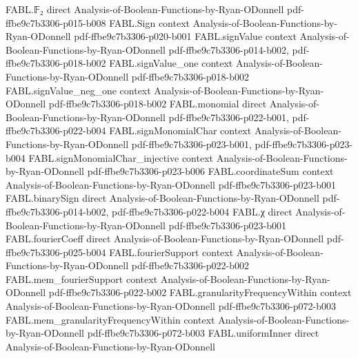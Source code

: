 \begin{theorem}
\label{FABL.composedMajority_monotone}
\leanok
{}
\proofstep
  {FABL.𝔽₂}
  {direct}
  {Analysis-of-Boolean-Functions-by-Ryan-ODonnell}
  {pdf-ffbe9c7b3306-p015-b008}
\proofstep
  {FABL.Sign}
  {context}
  {Analysis-of-Boolean-Functions-by-Ryan-ODonnell}
  {pdf-ffbe9c7b3306-p020-b001}
\proofstep
  {FABL.signValue}
  {context}
  {Analysis-of-Boolean-Functions-by-Ryan-ODonnell}
  {pdf-ffbe9c7b3306-p014-b002,
    pdf-ffbe9c7b3306-p018-b002}
\proofstep
  {FABL.signValue_one}
  {context}
  {Analysis-of-Boolean-Functions-by-Ryan-ODonnell}
  {pdf-ffbe9c7b3306-p018-b002}
\proofstep
  {FABL.signValue_neg_one}
  {context}
  {Analysis-of-Boolean-Functions-by-Ryan-ODonnell}
  {pdf-ffbe9c7b3306-p018-b002}
\proofstep
  {FABL.monomial}
  {direct}
  {Analysis-of-Boolean-Functions-by-Ryan-ODonnell}
  {pdf-ffbe9c7b3306-p022-b001,
    pdf-ffbe9c7b3306-p022-b004}
\proofstep
  {FABL.signMonomialChar}
  {context}
  {Analysis-of-Boolean-Functions-by-Ryan-ODonnell}
  {pdf-ffbe9c7b3306-p023-b001,
    pdf-ffbe9c7b3306-p023-b004}
\proofstep
  {FABL.signMonomialChar_injective}
  {context}
  {Analysis-of-Boolean-Functions-by-Ryan-ODonnell}
  {pdf-ffbe9c7b3306-p023-b006}
\proofstep
  {FABL.coordinateSum}
  {context}
  {Analysis-of-Boolean-Functions-by-Ryan-ODonnell}
  {pdf-ffbe9c7b3306-p023-b001}
\proofstep
  {FABL.binarySign}
  {direct}
  {Analysis-of-Boolean-Functions-by-Ryan-ODonnell}
  {pdf-ffbe9c7b3306-p014-b002,
    pdf-ffbe9c7b3306-p022-b004}
\proofstep
  {FABL.χ}
  {direct}
  {Analysis-of-Boolean-Functions-by-Ryan-ODonnell}
  {pdf-ffbe9c7b3306-p023-b001}
\proofstep
  {FABL.fourierCoeff}
  {direct}
  {Analysis-of-Boolean-Functions-by-Ryan-ODonnell}
  {pdf-ffbe9c7b3306-p025-b004}
\proofstep
  {FABL.fourierSupport}
  {context}
  {Analysis-of-Boolean-Functions-by-Ryan-ODonnell}
  {pdf-ffbe9c7b3306-p022-b002}
\proofstep
  {FABL.mem_fourierSupport}
  {context}
  {Analysis-of-Boolean-Functions-by-Ryan-ODonnell}
  {pdf-ffbe9c7b3306-p022-b002}
\proofstep
  {FABL.granularityFrequencyWithin}
  {context}
  {Analysis-of-Boolean-Functions-by-Ryan-ODonnell}
  {pdf-ffbe9c7b3306-p072-b003}
\proofstep
  {FABL.mem_granularityFrequencyWithin}
  {context}
  {Analysis-of-Boolean-Functions-by-Ryan-ODonnell}
  {pdf-ffbe9c7b3306-p072-b003}
\proofstep
  {FABL.uniformInner}
  {direct}
  {Analysis-of-Boolean-Functions-by-Ryan-ODonnell}

\end{theorem}
